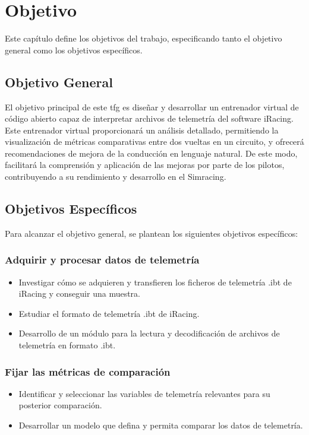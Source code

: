 \chapter{Objetivo}
\label{cap:Objetivo}
Este capítulo define los objetivos del trabajo, especificando tanto el objetivo general como los objetivos específicos.


\section{Objetivo General}

El objetivo principal de este \ac{tfg} es diseñar y desarrollar un entrenador virtual de código abierto capaz de interpretar archivos de telemetría del software iRacing. Este entrenador virtual proporcionará un análisis detallado, permitiendo la visualización de métricas comparativas entre dos vueltas en un circuito, y ofrecerá recomendaciones de mejora de la conducción en lenguaje natural. De este modo, facilitará la comprensión y aplicación de las mejoras por parte de los pilotos, contribuyendo a su rendimiento y desarrollo en el Simracing.

\section{Objetivos Específicos}
Para alcanzar el objetivo general, se plantean los siguientes objetivos específicos:

\subsection{Adquirir y procesar datos de telemetría}
\begin{itemize}
    \item Investigar cómo se adquieren y transfieren los ficheros de telemetría .ibt de iRacing y conseguir una muestra.
    \item Estudiar el formato de telemetría .ibt de iRacing.
    \item Desarrollo de un módulo para la lectura y decodificación de archivos de telemetría en formato .ibt.
\end{itemize}

\subsection{Fijar las métricas de comparación}
\begin{itemize}
    \item Identificar y seleccionar las variables de telemetría relevantes para su posterior comparación.
    \item Desarrollar un modelo que defina y permita comparar los datos de telemetría.
\end{itemize}

